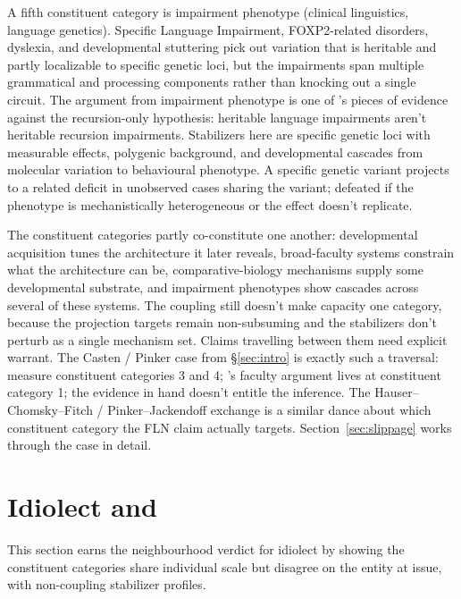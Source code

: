 \documentclass[12pt]{article}
\begin{document}
A fifth constituent category is impairment phenotype (clinical linguistics, language genetics). Specific Language Impairment, FOXP2-related disorders, dyslexia, and developmental stuttering pick out variation that is heritable and partly localizable to specific genetic loci, but the impairments span multiple grammatical and processing components rather than knocking out a single circuit. The argument from impairment phenotype is one of \citeauthor{pinkerjackendoff2005}'s pieces of evidence against the recursion-only hypothesis: heritable language impairments aren't heritable recursion impairments. Stabilizers here are specific genetic loci with measurable effects, polygenic background, and developmental cascades from molecular variation to behavioural phenotype. A specific genetic variant projects to a related deficit in unobserved cases sharing the variant; defeated if the phenotype is mechanistically heterogeneous or the effect doesn't replicate.

The constituent categories partly co-constitute one another: developmental acquisition tunes the architecture it later reveals, broad-faculty systems constrain what the architecture can be, comparative-biology mechanisms supply some developmental substrate, and impairment phenotypes show cascades across several of these systems. The coupling still doesn't make capacity one category, because the projection targets remain non-subsuming and the stabilizers don't perturb as a single mechanism set. Claims travelling between them need explicit warrant. The Casten / Pinker case from §\ref{sec:intro} is exactly such a traversal: \citeauthor{casten2026} measure constituent categories 3 and 4; \citeauthor{pinkerbloom1990}'s faculty argument lives at constituent category 1; the evidence in hand doesn't entitle the inference. The Hauser--Chomsky--Fitch / Pinker--Jackendoff exchange is a similar dance about which constituent category the FLN claim actually targets. Section~\ref{sec:slippage} works through the case in detail.

\section{Idiolect and }\label{sec:idiolect}

This section earns the neighbourhood verdict for idiolect by showing the constituent categories share individual scale but disagree on the entity at issue, with non-coupling stabilizer profiles.
\end{document}
